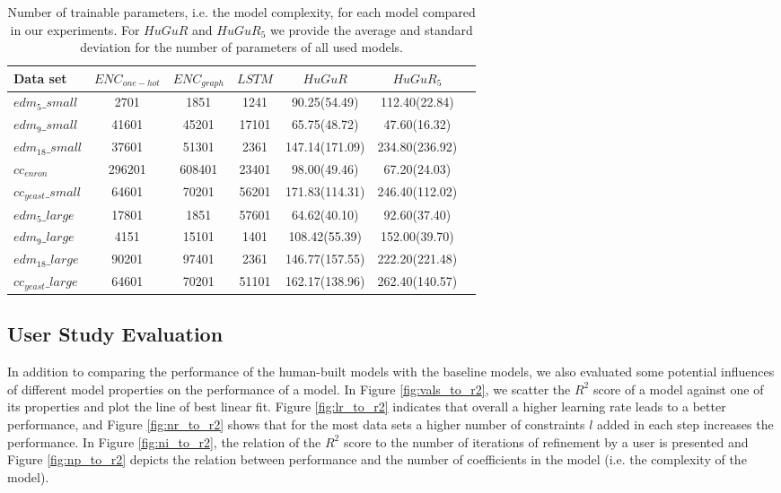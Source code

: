 \begin{table}[]
    \centering
    \caption{Number of trainable parameters, i.e. the model complexity, for each model compared in our experiments. For $HuGuR$ and $HuGuR_5$ we provide the average and standard deviation for the number of parameters of all used models.}
    \label{tab:model_comp}
    \begin{tabular}{l|cccccc}
    \toprule
         Data set  & $ENC_{one-hot}$ & $ENC_{graph}$ & $LSTM$ & $HuGuR$ & $HuGuR_5$  \\
         \midrule
$edm_5\_small$   &  2701  &  1851  &  1241  & 90.25(54.49) & 112.40(22.84) \\ 
$edm_9\_small$   &  41601  &  45201  &  17101  & 65.75(48.72) & 47.60(16.32) \\ 
$edm_{18}\_small$   &  37601  &  51301  &  2361  & 147.14(171.09) & 234.80(236.92) \\ 
$cc_{enron}$ &   296201  &  608401  &  23401  & 98.00(49.46) & 67.20(24.03) \\ 
$cc_{yeast}\_small$   &  64601  &  70201  &  56201  & 171.83(114.31) & 246.40(112.02) \\ 
\hline 
$edm_5\_large$   &  17801  &  1851  &  57601  & 64.62(40.10) & 92.60(37.40) \\ 
$edm_9\_large$   &  4151  &  15101  &  1401  & 108.42(55.39) & 152.00(39.70) \\ 
$edm_{18}\_large$   &  90201  &  97401  &  2361  & 146.77(157.55) & 222.20(221.48) \\ 
$cc_{yeast}\_large$   &  64601  &  70201  &  51101  & 162.17(138.96) &  262.40(140.57)\\
        \bottomrule
    \end{tabular}
    
    
\end{table}






\subsection{User Study Evaluation}

In addition to comparing the performance of the human-built models with the baseline models, we also evaluated some potential influences of different model properties on the performance of a model. In Figure \ref{fig:vals_to_r2}, we scatter the $R^2$ score of a model against one of its properties and plot the line of best linear fit. Figure \ref{fig:lr_to_r2} indicates that overall a higher learning rate leads to a better performance, and Figure \ref{fig:nr_to_r2} shows that for the most data sets a higher number of constraints $l$ added in each step increases the performance. In Figure \ref{fig:ni_to_r2}, the relation of the $R^2$ score to the number of iterations of refinement by a user is presented and Figure \ref{fig:np_to_r2} depicts the relation between performance and the number of coefficients in the model (i.e. the complexity of the model). 


